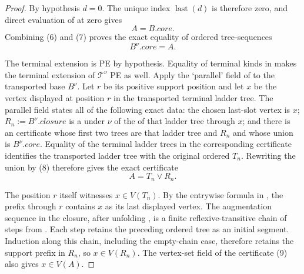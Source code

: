 \begin{proof}
By hypothesis $d=0$.  The unique index $\operatorname{last}(d)$ is
therefore zero, and direct evaluation of
 at zero gives
\[
                              A=B.\mathit{core}.                \tag{7}
\]
Combining (6) and (7) proves the exact equality of ordered tree-sequences
\[
                              B^\nu.\mathit{core}=A.            \tag{8}
\]

The terminal extension is PE by hypothesis.  Equality of terminal kinds
in  makes the terminal
extension of $\mathcal T^\nu$ PE as well.  Apply the `parallel' field of
 to the transported base $B^\nu$.  Let $r$ be its
positive support position and let $x$ be the vertex displayed at position
$r$ in the transported terminal ladder tree.  The parallel field states
all of the following exact data: the chosen last-slot vertex is $x$;
$R_n:=B^\nu.\mathit{closure}$ is a
 under $\nu$ of the
 of that ladder tree through $x$; and there is
an  certificate whose first two trees are that
ladder tree and $R_n$ and whose union is $B^\nu.\mathit{core}$.  Equality
of the terminal ladder trees in the corresponding certificate identifies
the transported ladder tree with the original ordered $T_n$.  Rewriting
the union by (8) therefore gives the exact certificate
\[
                         A=T_n\vee R_n.                         \tag{9}
\]

The position $r$ itself witnesses $x\in V(T_n)$.  By the entrywise formula
in , the prefix through $r$ contains $x$ as
its last displayed vertex.  The augmentation sequence in the closure,
after unfolding , is a finite
reflexive-transitive chain of steps from .
Each step retains the preceding ordered tree as an initial segment.
Induction along this chain, including the empty-chain case, therefore
retains the support prefix in $R_n$, so $x\in V(R_n)$.  The vertex-set
field of the  certificate (9) also gives
$x\in V(A)$.


\end{proof}
